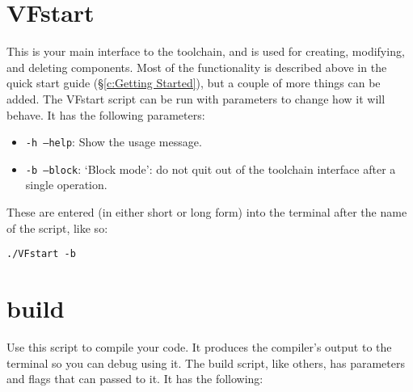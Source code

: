 \documentclass[a4paper, oneside, 11pt, titlepage, onecolumn, openright]{report}
\begin{document}
			\section{VFstart}
				\label{s:Scripts:VFstart}
			
				This is your main interface to the toolchain, and is used for creating, modifying, and deleting components. Most of the functionality is described above in the quick start guide (\S\ref{c:Getting Started}), but a couple of more things can be added.  The VFstart script can be run with parameters to change how it will behave. It has the following parameters:
	
				\begin{itemize}
			
					\item \texttt{-h --help}: Show the usage message.
				
					\item \texttt{-b --block}: `Block mode': do not quit out of the toolchain interface after a single operation.

				\end{itemize} 		

These are entered (in either short or long form) into the terminal after the name of the script, like so:

				\begin{lstlisting}
./VFstart -b
				\end{lstlisting}
			
			\section{build}
				\label{s:Scripts:build}

				Use this script to compile your code. It produces the compiler's output to the terminal so you can debug using it.  The build script, like others, has parameters and flags that can passed to it. It has the following:
			
\end{document}
